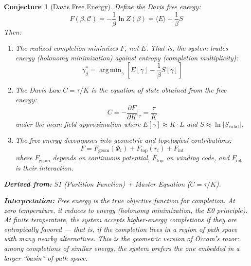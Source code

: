 \documentclass[11pt,letterpaper]{article}
\newtheorem{conjecture}{Conjecture}[section]
\newcommand{\Svalid}{S_{\mathrm{valid}}}
\DeclareMathOperator*{\argmin}{arg\,min}
\begin{document}
\begin{conjecture}[Davis Free Energy]\label{conj:free_energy}
Define the \emph{Davis free energy}:
\begin{equation}\label{eq:free_energy}
    F(\beta, \mathcal{C}) = -\frac{1}{\beta} \ln Z(\beta) 
    = \langle E \rangle - \frac{1}{\beta} S
\end{equation}
Then:

\begin{enumerate}[label=(\alph*)]
    \item The realized completion minimizes $F$, not $E$. That is, the 
    system trades energy (holonomy minimization) against entropy 
    (completion multiplicity):
    \begin{equation}
        \gamma^*_\beta = \argmin_\gamma \left[ E[\gamma] 
        - \frac{1}{\beta} S[\gamma] \right]
    \end{equation}
    
    \item The Davis Law $C = \tau / K$ is the \emph{equation of state} 
    obtained from the free energy:
    \begin{equation}\label{eq:eos}
        C = -\frac{\partial F}{\partial K}\bigg|_{\tau} 
        = \frac{\tau}{K}
    \end{equation}
    under the mean-field approximation where $E[\gamma] \approx K \cdot L$ 
    and $S \approx \ln |\Svalid|$.
    
    \item The free energy decomposes into geometric and topological 
    contributions:
    \begin{equation}\label{eq:free_decomp}
        F = F_{\mathrm{geom}}(\Phi_t) + F_{\mathrm{top}}(r_t) + F_{\mathrm{int}}
    \end{equation}
    where $F_{\mathrm{geom}}$ depends on continuous potential, 
    $F_{\mathrm{top}}$ on winding code, and $F_{\mathrm{int}}$ is their 
    interaction.
\end{enumerate}

\textbf{Derived from:} S1 (Partition Function) + Master Equation 
($C = \tau/K$).

\textbf{Interpretation:} Free energy is the true objective function for 
completion. At zero temperature, it reduces to energy (holonomy 
minimization, the E0 principle). At finite temperature, the system accepts 
higher-energy completions if they are entropically favored --- that is, if 
the completion lives in a region of path space with many nearby alternatives. 
This is the geometric version of Occam's razor: among completions of similar 
energy, the system prefers the one embedded in a larger ``basin'' of 
path space.
\end{conjecture}
\end{document}
